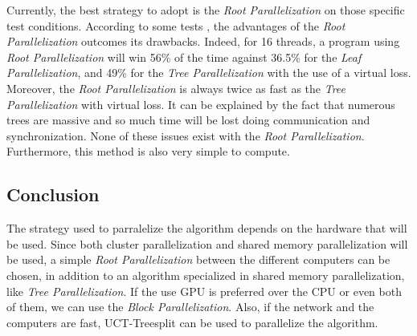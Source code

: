 Currently, the best strategy to adopt is the \emph{Root Parallelization} on those specific test conditions. According to some tests \cite{parallel_comp,tree_root_comp}, the advantages of the \emph{Root Parallelization} outcomes its drawbacks. Indeed, for 16 threads, a program using \emph{Root Parallelization} will win 56\% of the time against 36.5\% for the \emph{Leaf Parallelization}, and 49\% for the \emph{Tree Parallelization} with the use of a virtual loss. Moreover, the \emph{Root Parallelization} is always twice as fast as the \emph{Tree Parallelization} with virtual loss. It can be explained by the fact that numerous trees are massive and so much time will be lost doing communication and synchronization. None of these issues exist with the \emph{Root Parallelization}. Furthermore, this method is also very simple to compute.

\subsection{Conclusion}

The strategy used to parralelize the algorithm depends on the hardware that will be used. Since both cluster parallelization and shared memory parallelization will be used, a simple \emph{Root Parallelization} between the different computers can be chosen, in addition to an algorithm specialized in shared memory parallelization, like \emph{Tree Parallelization}. If the use GPU is preferred over the CPU or even both of them, we can use the \emph{Block Parallelization}. Also, if the network and the computers are fast, UCT-Treesplit can be used to parallelize the algorithm.
